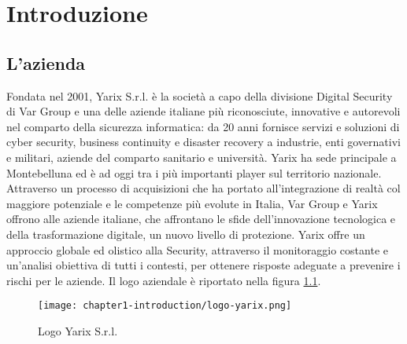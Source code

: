 
\chapter{Introduzione}
\label{cap:introduzione}

\newline{}

\section{L’azienda}

Fondata nel 2001, Yarix S.r.l. è la società a capo della divisione Digital Security di Var Group e una delle aziende italiane più riconosciute, innovative e autorevoli nel comparto della sicurezza informatica: da 20 anni fornisce servizi e soluzioni di cyber security, business continuity e disaster recovery a industrie, enti governativi e militari, aziende del comparto sanitario e università. Yarix ha sede principale a Montebelluna ed è ad oggi tra i più importanti player sul territorio nazionale.\newline{}
Attraverso un processo di acquisizioni che ha portato all’integrazione di realtà col maggiore potenziale e le competenze più evolute in Italia, Var Group e Yarix offrono alle aziende italiane, che affrontano le sfide dell’innovazione tecnologica e della trasformazione digitale, un nuovo livello di protezione. Yarix offre un approccio globale ed olistico alla Security, attraverso il monitoraggio costante e un’analisi obiettiva di tutti i contesti, per ottenere risposte adeguate a prevenire i rischi per le aziende. Il logo aziendale è riportato nella figura \ref{fig:yarix}.

\begin{figure}[!h] 
    \centering 
    \texttt{[image: chapter1-introduction/logo-yarix.png]} 
    \caption{Logo Yarix S.r.l.}
    \label{fig:yarix}
\end{figure}

